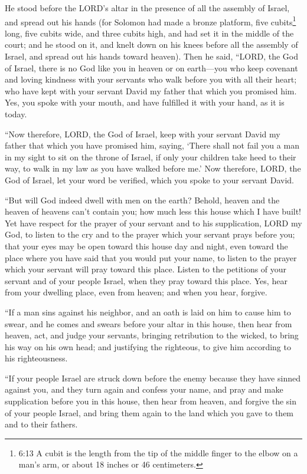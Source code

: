 \myverse{}He stood before the LORD’s altar in the presence of all the assembly
of Israel, and spread out his hands
\myverse{}(for Solomon had made a bronze platform, five cubits\footnote{6:13 A cubit is the length from the tip of the middle finger to the elbow on a man’s arm, or about
	18 inches or 46 centimeters.} long, five cubits wide, and three cubits high, and had set it in
the middle of the court; and he stood on it, and knelt down on his knees before all the assembly of Israel,
and spread out his hands toward heaven).
\myverse{}Then he said, “LORD, the God of Israel, there is no God like you in heaven
or on earth—you who keep covenant and loving kindness with your servants who walk before you with all
their heart;
\myverse{}who have kept with your servant David my father that which you promised him.
Yes, you spoke with your mouth, and have fulfilled it with your hand, as it is today.

\myverse{}“Now therefore, LORD, the God of Israel, keep with your servant
David my father that which you have promised him, saying, ‘There shall not fail you a man in my sight
to sit on the throne of Israel, if only your children take heed to their way, to walk in my law as you
have walked before me.’
\myverse{}Now therefore, LORD, the God of Israel, let your word be verified, which you
spoke to your servant David.

\myverse{}“But will God indeed dwell with men on the earth? Behold, heaven
and the heaven of heavens can’t contain you; how much less this house which I have built!
\myverse{}Yet have respect for the prayer of your servant and to his supplication, LORD
my God, to listen to the cry and to the prayer which your servant prays before you;
\myverse{}that your eyes may be open toward this house day and night, even toward the
place where you have said that you would put your name, to listen to the prayer which your servant will
pray toward this place.
\myverse{}Listen to the petitions of your servant and of your people Israel, when they
pray toward this place. Yes, hear from your dwelling place, even from heaven; and when you hear, forgive.

\myverse{}“If a man sins against his neighbor, and an oath is laid on him
to cause him to swear, and he comes and swears before your altar in this house,
\myverse{}then hear from heaven, act, and judge your servants, bringing retribution
to the wicked, to bring his way on his own head; and justifying the righteous, to give him according to
his righteousness.

\myverse{}“If your people Israel are struck down before the enemy because
they have sinned against you, and they turn again and confess your name, and pray and make supplication
before you in this house,
\myverse{}then hear from heaven, and forgive the sin of your people Israel, and bring
them again to the land which you gave to them and to their fathers.

